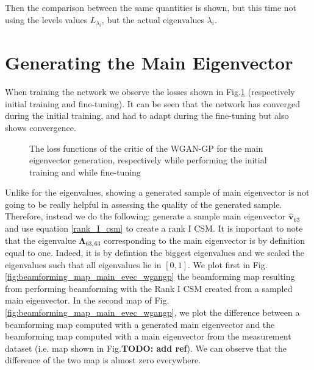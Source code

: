 \documentclass[11pt,a4paper,twoside]{report}
\begin{document}
Then the comparison between the same quantities is shown, but this time not using the levels values $L_{\lambda_i}$, but the actual eigenvalues $\lambda_{i}$.

\section{Generating the Main Eigenvector}

When training the network we observe the losses shown in Fig.\ref{fig:loss_main_evec_wgangp} (respectively initial training and fine-tuning). It can be seen that the network has converged during the initial training, and had to adapt during the fine-tuning but also shows convergence.

\begin{figure}
    \centering
    \caption{The loss functions of the critic of the WGAN-GP for the main eigenvector generation, respectively while performing the initial training and while fine-tuning}
    \label{fig:loss_main_evec_wgangp}
\end{figure}

Unlike for the eigenvalues, showing a generated sample of main eigenvector is not going to be really helpful in assessing the quality of the generated sample. Therefore, instead we do the following: generate a sample main eigenvector $\hat{\mathbf{v}}_{63}$ and use equation \ref{rank_I_csm} to create a rank I CSM. It is important to note that the eigenvalue $\mathbf{\Lambda}_{63, 63}$ corresponding to the main eigenvector is by definition equal to one. Indeed, it is by defintion the biggest eigenvalues and we scaled the eigenvalues such that all eigenvalues lie in $[0,1]$. We plot first in Fig.\ref{fig:beamforming_map_main_evec_wgangp} the beamforming map resulting from performing beamforming with the Rank I CSM created from a sampled main eigenvector. In the second map of Fig.\ref{fig:beamforming_map_main_evec_wgangp}, we plot the difference between a beamforming map computed with a generated main eigenvector and the beamforming map computed with a main eigenvector from the measurement dataset (i.e. map shown in Fig.\textbf{TODO: add ref}). We can observe that the difference of the two map is almost zero everywhere.
\end{document}
